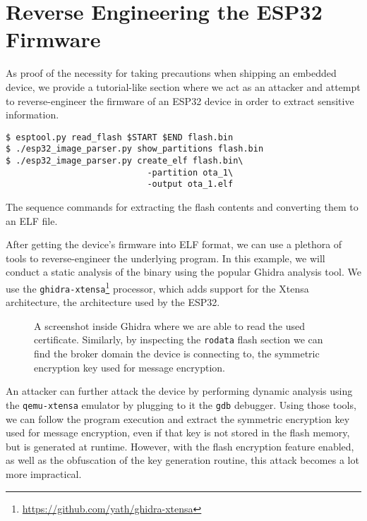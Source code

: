 \documentclass[conference]{IEEEtran}
\begin{document}



\appendices
{}

\section{Reverse Engineering the ESP32 Firmware}
\label{appendix:reverse_engineering}

As proof of the necessity for taking precautions when shipping an embedded device, 
we provide a tutorial-like section where we act as an attacker and attempt to reverse-engineer the firmware of an ESP32
device in order to extract sensitive information.

\begin{listing}[h]
\begin{verbatim}
$ esptool.py read_flash $START $END flash.bin
$ ./esp32_image_parser.py show_partitions flash.bin
$ ./esp32_image_parser.py create_elf flash.bin\
                            -partition ota_1\
                            -output ota_1.elf
\end{verbatim}
\caption{The sequence commands for extracting the flash contents and converting them to an ELF file.}
\end{listing}

After getting the device's firmware into ELF format, we can use a plethora of tools 
to reverse-engineer the underlying program. 
In this example, we will conduct a static analysis of the binary using the popular Ghidra\cite{Ghidra, GhidraBook} analysis tool.
We use the \texttt{ghidra-xtensa}\footnote{\url{https://github.com/yath/ghidra-xtensa}} processor,
which adds support for the Xtensa architecture, the architecture used by the ESP32.

\begin{figure}[h]
    \centering
    \caption{A screenshot inside Ghidra where we are able to read the used certificate. Similarly, 
    by inspecting the \texttt{rodata} flash section we can find the broker domain the device is connecting to, the 
    symmetric encryption key used for message encryption.}
    \label{fig:ghidra}
\end{figure}

An attacker can further attack the device by performing dynamic analysis using the \texttt{qemu-xtensa} emulator
by plugging to it the \texttt{gdb} debugger. 
Using those tools, we can follow the program execution and extract the symmetric encryption key used for message encryption, 
even if that key is not stored in the flash memory, but is generated at runtime.
However, with the flash encryption feature enabled, as well as the obfuscation of the key generation routine,
this attack becomes a lot more impractical.
\end{document}
